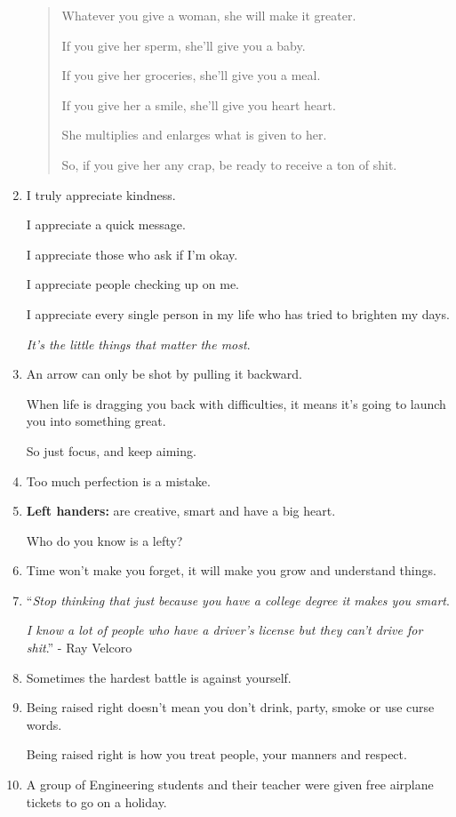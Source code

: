 \documentclass{article}
\begin{document}
\begin{enumerate}
\begin{quotation}
		Whatever you give a woman, she will make it greater.
		
		If you give her sperm, she'll give you a baby.
		
		If you give her groceries, she'll give you a meal.
		
		If you give her a smile, she'll give you heart heart.
		
		She multiplies and enlarges what is given to her.
		
		So, if you give her any crap, be ready to receive a ton of shit.
	\end{quotation}
	\item I truly appreciate kindness.
	
	I appreciate a quick message.
	
	I appreciate those who ask if I'm okay.
	
	I appreciate people checking up on me.
	
	I appreciate every single person in my life who has tried to brighten my days.
	
	\textit{It's the little things that matter the most}.
	\item An arrow can only be shot by pulling it backward.
	
	When life is dragging you back with difficulties, it means it's going to launch you into something great.
	
	So just focus, and keep aiming.
	\item Too much perfection is a mistake.
	\item \textbf{Left handers:} are creative, smart and have a big heart.
	
	Who do you know is a lefty?
	\item Time won't make you forget, it will make you grow and understand things.
	\item ``\textit{Stop thinking that just because you have a college degree it makes you smart}.
	
	\textit{I know a lot of people who have a driver's license but they can't drive for shit}.'' - Ray Velcoro
	\item Sometimes the hardest battle is against yourself.
	\item Being raised right doesn't mean you don't drink, party, smoke or use curse words.
	
	Being raised right is how you treat people, your manners and respect.
	\item A group of Engineering students and their teacher were given free airplane tickets to go on a holiday.
	

\end{enumerate}
\end{document}
